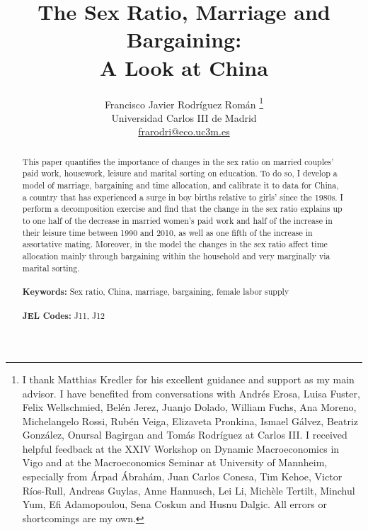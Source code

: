 \documentclass[12pt]{article}
\begin{document}
\begin{titlepage}
\title{The Sex Ratio, Marriage and Bargaining: \\ A Look at China} %
\author{Francisco Javier Rodr\'iguez Rom\'an \thanks{I thank Matthias Kredler for his excellent guidance and support as my main advisor. I have benefited from conversations with Andr\'es Erosa, Luisa Fuster, Felix Wellschmied, Bel\'en Jerez, Juanjo Dolado, William Fuchs, Ana Moreno, Michelangelo Rossi, Rub\'en Veiga, Elizaveta Pronkina, Ismael G\'alvez, Beatriz Gonz\'alez, Onursal Bagirgan and Tom\'as Rodr\'iguez at Carlos III. I received helpful feedback at the XXIV Workshop on Dynamic Macroeconomics in Vigo and at the Macroeconomics Seminar at University of Mannheim, especially from \'Arpad \'Abrah\'am, Juan Carlos Conesa, Tim Kehoe, Victor R\'ios-Rull, Andreas Guylas, Anne Hannusch, Lei Li, Mich\`ele Tertilt, Minchul Yum, Efi Adamopoulou, Sena Coskun and Husnu Dalgic. All errors or shortcomings are my own.} \\
		Universidad Carlos III de Madrid \\
		\href{mailto:frarodri@eco.uc3m.es}{frarodri@eco.uc3m.es}}
\date{}
\maketitle
\begin{abstract}
\noindent  
This paper quantifies the importance of changes in the sex ratio on married couples' paid work, housework, leisure and marital sorting on education. To do so, I develop a model of marriage, bargaining and time allocation, and calibrate it to data for China, a country that has experienced a surge in boy births relative to girls' since the 1980s. I perform a decomposition exercise and find that the change in the sex ratio explains up to one half of the decrease in married women's paid work and half of the increase in their leisure time between 1990 and 2010, as well as one fifth of the increase in assortative mating. Moreover, in the model the changes in the sex ratio affect time allocation mainly through bargaining within the household and very marginally via marital sorting. \\
\vspace{0in}\\
\noindent\textbf{Keywords:} Sex ratio, China, marriage, bargaining, female labor supply \\
\vspace{0in}\\
\noindent\textbf{JEL Codes:} J11, J12\\

\bigskip
\end{abstract}
\setcounter{page}{0}
\thispagestyle{empty}
\end{titlepage}
\pagebreak \newpage
\end{document}
